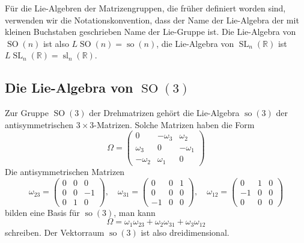 Für die Lie-Algebren der Matrizengruppen, die früher definiert worden
sind, verwenden wir die Notationskonvention, dass der Name der
Lie-Algebra der mit kleinen Buchstaben geschrieben Name der Lie-Gruppe ist.
Die Lie-Algebra von $\operatorname{SO}(n)$ ist also
$L\operatorname{SO}(n) = \operatorname{so}(n)$,
%
die Lie-Algebra von $\operatorname{SL}_n(\mathbb{R})$ ist
$L\operatorname{SL}_n(\mathbb{R})=\operatorname{sl}_n(\mathbb{R})$.
%

%
%
\subsection{Die Lie-Algebra von $\operatorname{SO}(3)$
\label{buch:subsection:die-lie-algebra-von-so3}}
Zur Gruppe $\operatorname{SO}(3)$ der Drehmatrizen gehört die Lie-Algebra
$\operatorname{so}(3)$ der antisymmetrischen $3\times 3$-Matrizen.
Solche Matrizen haben die Form
\[
\Omega
=
\begin{pmatrix}
    0    &-\omega_3& \omega_2\\
 \omega_3&   0     &-\omega_1\\
-\omega_2& \omega_1&    0
\end{pmatrix}
\]
Die antisymmetrischen Matrizen
\[
\omega_{23}
=
\begin{pmatrix} 0&0&0\\0&0&-1\\0&1&0\end{pmatrix},
\quad
\omega_{31}
=
\begin{pmatrix} 0&0&1\\0&0&0\\-1&0&0\end{pmatrix},
\quad
\omega_{12}
=
\begin{pmatrix} 0&1&0\\-1&0&0\\0&0&0\end{pmatrix}
\]
bilden eine Basis für $\operatorname{so}(3)$, man kann
\[
\Omega
=
\omega_1\omega_{23}
+
\omega_2\omega_{31}
+
\omega_3\omega_{12}
\]
schreiben.
Der Vektorraum $\operatorname{so}(3)$ ist also dreidimensional.

